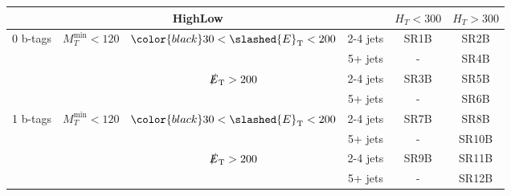 \documentclass[plain,landscape]{article}
\newcommand{\met}{\slashed{E}_\mathrm{T}}
\begin{document}
\begin{table}
\renewcommand{\arraystretch}{1.3}
\centering
\begin{tabular}{|c|c|c|c|c|c|}
\hline
\multicolumn{4}{|c|}{ \textbf{HighLow} }                      & $H_T < 300$ & $ H_T > 300$  \\ \hline
\multirow{4}{*}{0 b-tags}  & \multirow{4}{*}{$M_T^{\textrm{min}} < 120$} & \multirow{2}{*}{${\color{black} 30} < \met < 200$}  & 2-4 jets & SR1B        & SR2B \\ \cline{4-6}
                           &                                             &                                              & 5+ jets  & -           & SR4B  \\ \cline{3-6}
                           &                                             & \multirow{2}{*}{$\met > 200$}                & 2-4 jets & SR3B        & SR5B  \\ \cline{4-6}
                           &                                             &                                              & 5+ jets  & -           & SR6B   \\ \cline{1-6}
\multirow{4}{*}{1 b-tags}  & \multirow{4}{*}{$M_T^{\textrm{min}} < 120$} & \multirow{2}{*}{ ${\color{black} 30} < \met < 200$} & 2-4 jets & SR7B        & SR8B  \\ \cline{4-6}
                           &                                             &                                              & 5+ jets  & -           & SR10B  \\ \cline{3-6}
                           &                                             & \multirow{2}{*}{ $\met > 200$}               & 2-4 jets & SR9B        & SR11B  \\ \cline{4-6}
                           &                                             &                                              & 5+ jets  & -           & SR12B  \\ \cline{1-6}
\end{tabular}
\end{table}
\end{document}
